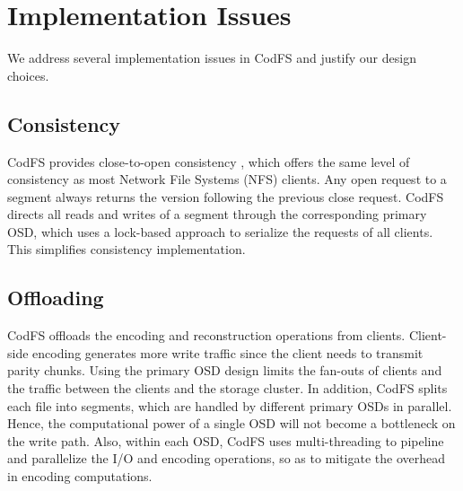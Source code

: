 
\section{Implementation Issues}
\label{sec:issues}

We address several implementation issues in CodFS and justify our design
choices. 

\subsection{Consistency} CodFS provides close-to-open consistency
\cite{howard88}, which offers the same level of consistency as most Network
File Systems (NFS) clients. Any open request to a segment always
returns the version following the previous close request. CodFS directs all
reads and writes of a segment through the corresponding primary OSD, which
uses a lock-based approach to serialize the requests of all clients.  This
simplifies consistency implementation. 

\subsection{Offloading} 
CodFS offloads the encoding and reconstruction operations from clients. 
Client-side encoding generates more write traffic 
since the client needs to transmit parity chunks.  Using the primary
OSD design limits the fan-outs of clients and the traffic between the
clients and the storage cluster.  In addition, CodFS splits each file into
segments, which are handled by different primary OSDs in parallel.  Hence, the
computational power of a single OSD will not become a bottleneck on the write
path.  Also, within each OSD, CodFS uses multi-threading to pipeline and
parallelize the I/O and encoding operations, so as to mitigate the overhead
in encoding computations. 

